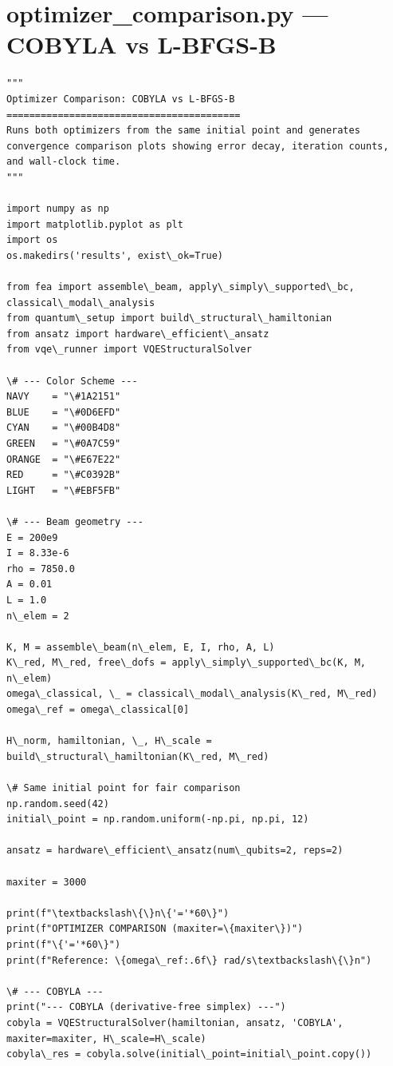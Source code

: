 \documentclass[12pt, a4paper]{article}
\begin{document}
\section{optimizer_comparison.py --- COBYLA vs L-BFGS-B}
\begin{lstlisting}[style=codestyle, caption={{optimizer_comparison.py --- COBYLA vs L-BFGS-B}}]
"""
Optimizer Comparison: COBYLA vs L-BFGS-B
=========================================
Runs both optimizers from the same initial point and generates
convergence comparison plots showing error decay, iteration counts,
and wall-clock time.
"""

import numpy as np
import matplotlib.pyplot as plt
import os
os.makedirs('results', exist\_ok=True)

from fea import assemble\_beam, apply\_simply\_supported\_bc, classical\_modal\_analysis
from quantum\_setup import build\_structural\_hamiltonian
from ansatz import hardware\_efficient\_ansatz
from vqe\_runner import VQEStructuralSolver

\# --- Color Scheme ---
NAVY    = "\#1A2151"
BLUE    = "\#0D6EFD"
CYAN    = "\#00B4D8"
GREEN   = "\#0A7C59"
ORANGE  = "\#E67E22"
RED     = "\#C0392B"
LIGHT   = "\#EBF5FB"

\# --- Beam geometry ---
E = 200e9
I = 8.33e-6
rho = 7850.0
A = 0.01
L = 1.0
n\_elem = 2

K, M = assemble\_beam(n\_elem, E, I, rho, A, L)
K\_red, M\_red, free\_dofs = apply\_simply\_supported\_bc(K, M, n\_elem)
omega\_classical, \_ = classical\_modal\_analysis(K\_red, M\_red)
omega\_ref = omega\_classical[0]

H\_norm, hamiltonian, \_, H\_scale = build\_structural\_hamiltonian(K\_red, M\_red)

\# Same initial point for fair comparison
np.random.seed(42)
initial\_point = np.random.uniform(-np.pi, np.pi, 12)

ansatz = hardware\_efficient\_ansatz(num\_qubits=2, reps=2)

maxiter = 3000

print(f"\textbackslash\{\}n\{'='*60\}")
print(f"OPTIMIZER COMPARISON (maxiter=\{maxiter\})")
print(f"\{'='*60\}")
print(f"Reference: \{omega\_ref:.6f\} rad/s\textbackslash\{\}n")

\# --- COBYLA ---
print("--- COBYLA (derivative-free simplex) ---")
cobyla = VQEStructuralSolver(hamiltonian, ansatz, 'COBYLA', maxiter=maxiter, H\_scale=H\_scale)
cobyla\_res = cobyla.solve(initial\_point=initial\_point.copy())


\end{lstlisting}
\end{document}
